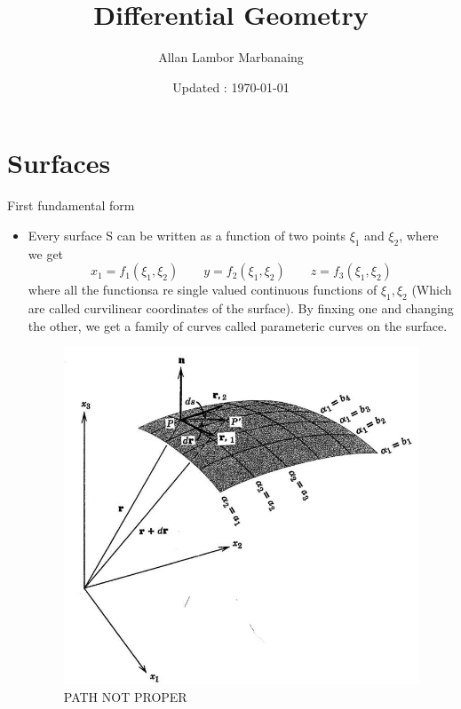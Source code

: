 


\title{Differential Geometry  }
\author{Allan Lambor Marbanaing}
\date{Updated : \today}



\maketitle
\tableofcontents	
	\section{Surfaces}
	\begin{frame}{First fundamental form}
		\begin{itemize}
			\item Every surface S  can be written as a function of two points $\xi_1$ and $\xi_2$, where we get
			\begin{equation}
			x_1 = f_1(\xi_1,\xi_2) \qquad y = f_2(\xi_1,\xi_2)\qquad z = f_3(\xi_1,\xi_2)
			\end{equation}
			where all the functionsa re single valued continuous functions of $\xi_1,\xi_2$ (Which are called curvilinear coordinates of the surface). By finxing one and changing the other, we get a family of curves called parameteric curves on the surface.
			\begin{figure}
				\centering
				\includegraphics[width=0.5\linewidth]{ fig1}
				\caption{PATH NOT PROPER}
				\label{fig:fig1}
			\end{figure}
			
 		\end{itemize}	
 	\end{frame}


